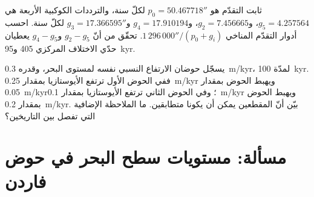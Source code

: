 \begin{exercise}[$\star\star\star$]\label{exo:b3:sequence-stratigraphy:11}
ثابت التقدّم هو $p_0 = 50.467718''$ لكلّ سنة، والترددات الكوكبية الأربعة
هي $g_5 = 4.257564$، و$g_2 = 7.456665$، و$g_4 = 17.910194$
و$g_3 = 17.366595''$ لكلّ سنة. احسب أدوار التقدّم المناخي
$1\,296\,000''/(p_0 + g_i)$. تحقّق من أنّ $g_2 - g_5$ و$g_4 - g_5$ يعطيان
حدّي الاختلاف المركزي 405 و\qty{95}{kyr}.
\end{exercise}

\begin{exercise}[$\star\star\star$]\label{exo:b3:sequence-stratigraphy:12}
يسجّل حوضان الارتفاع النسبي نفسه لمستوى البحر، وقدره \qty{0.3}{m/kyr}، لمدّة
\qty{100}{kyr}. ففي الحوض الأول ترتفع الأيوستازيا بمقدار \qty{0.25}{m/kyr}
ويهبط الحوض بمقدار \qty{0.05}{m/kyr}؛ وفي الحوض الثاني ترتفع الأيوستازيا
بمقدار \qty{0.1}{m/kyr} ويهبط الحوض بمقدار \qty{0.2}{m/kyr}. بيّن أنّ المقطعين
يمكن أن يكونا متطابقين.
ما الملاحظة الإضافية التي تفصل بين التاريخين؟
\end{exercise}

\section{مسألة: مستويات سطح البحر في حوض فاردن}

